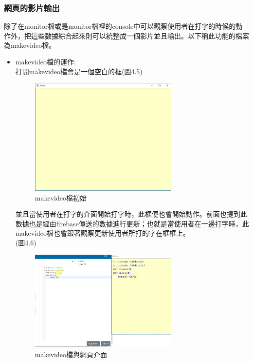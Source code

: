 \subsubsection{網頁的影片輸出}
除了在monitor檔或是monitor檔裡的console中可以觀察使用者在打字的時候的動作外，把這些數據綜合起來則可以統整成一個影片並且輸出。以下稱此功能的檔案為makevideo檔。\\
\begin{itemize}
	\item makevideo檔的運作:\\
	打開makevideo檔會是一個空白的框(圖4.5)
		\begin{figure}[H] 
		\centering 
		\includegraphics[width=0.7\textwidth]{video_space.png} 
		\caption{makevideo檔初始} 
		\label{Fig.4.4.1} 
		\end{figure}
	並且當使用者在打字的介面開始打字時，此框便也會開始動作。前面也提到此數據也是經由firebase傳送的數據進行更新；也就是當使用者在一邊打字時，此makevideo檔也會跟著觀察更新使用者所打的字在框框上。\\(圖4.6)
	\begin{figure}[H] 
		\centering 
		\includegraphics[width=0.7\textwidth]{frame.png} 
		\caption{makevideo檔與網頁介面} 
		\label{Fig.4.4.2} 
	\end{figure}


\end{itemize}
